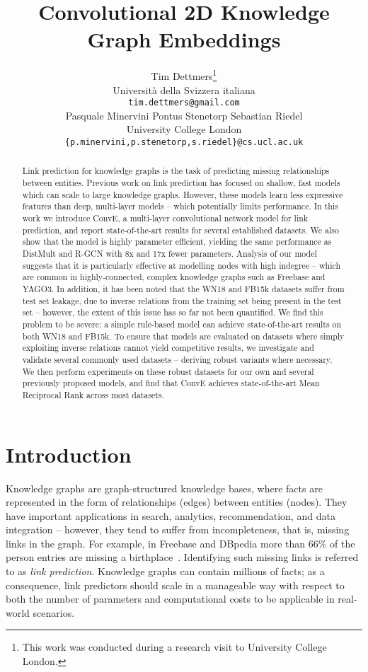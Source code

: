 \documentclass[letterpaper]{article}
\title{Convolutional 2D Knowledge Graph Embeddings}
\author{
    Tim Dettmers\thanks{This work was conducted during a research visit to University College London.} \\
    Università della Svizzera italiana \\
    \texttt{tim.dettmers@gmail.com} \\
    \AND
    Pasquale Minervini \quad Pontus Stenetorp \quad Sebastian Riedel\\
    University College London\\
    \texttt{\{p.minervini,p.stenetorp,s.riedel\}@cs.ucl.ac.uk} \\
}
\newcommand{\citep}{\cite}
\begin{document}
\maketitle

\begin{abstract}
Link prediction for knowledge graphs is the task of predicting missing relationships between entities.
Previous work on link prediction has focused on shallow, fast models which can scale to large knowledge graphs.
However, these models learn less expressive features than deep, multi-layer models -- which potentially limits performance.
In this work we introduce ConvE, a multi-layer convolutional network model for link prediction, and report state-of-the-art results for several established datasets.
We also show that the model is highly parameter efficient, yielding the same performance as DistMult and R-GCN with 8x and 17x fewer parameters.
Analysis of our model suggests that it is particularly effective at modelling nodes with high indegree -- which are common in highly-connected, complex knowledge graphs such as Freebase and YAGO3.
In addition, it has been noted that the WN18 and FB15k datasets suffer from test set leakage, due to inverse relations from the training set being present in the test set -- however, the extent of this issue has so far not been quantified.
We find this problem to be severe: a simple rule-based model can achieve state-of-the-art results on both WN18 and FB15k.
To ensure that models are evaluated on datasets where simply exploiting inverse relations cannot yield competitive results, we investigate and validate several commonly used datasets -- deriving robust variants where necessary.
We then perform experiments on these robust datasets for our own and several previously proposed models, and find that ConvE achieves state-of-the-art Mean Reciprocal Rank across most datasets.
\end{abstract}

\section{Introduction}

Knowledge graphs are graph-structured knowledge bases, where facts are represented in the form of relationships (edges) between entities (nodes).
They have important applications in search, analytics, recommendation, and data integration -- however, they tend to suffer from incompleteness, that is, missing links in the graph.
For example, in Freebase and DBpedia more than 66\% of the person entries are missing a birthplace~\citep{DBLP:conf/kdd/0001GHHLMSSZ14,DBLP:conf/semweb/KrompassBT15}.
Identifying such missing links is referred to as \emph{link prediction}.
Knowledge graphs can contain millions of facts; as a consequence, link predictors should scale in a manageable way with respect to both the number of parameters and computational costs to be applicable in real-world scenarios.
\end{document}
